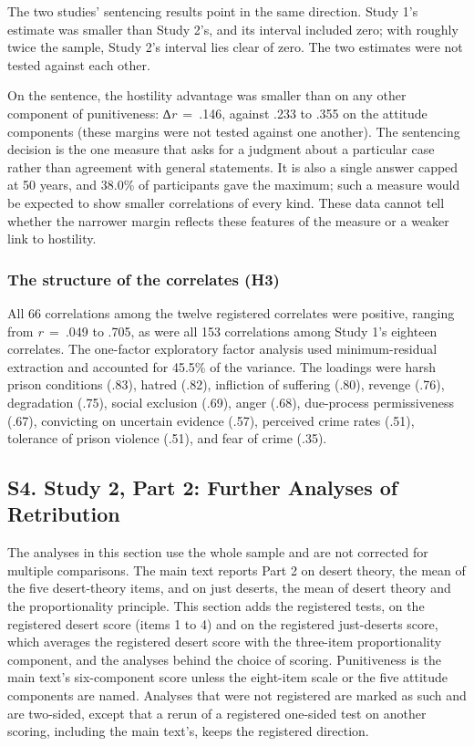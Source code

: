 The two studies' sentencing results point in the same direction. Study 1's estimate was smaller than Study 2's, and its interval included zero; with roughly twice the sample, Study 2's interval lies clear of zero. The two estimates were not tested against each other.

On the sentence, the hostility advantage was smaller than on any other component of punitiveness: ∆\emph{r}~=~.146, against .233 to .355 on the attitude components (these margins were not tested against one another). The sentencing decision is the one measure that asks for a judgment about a particular case rather than agreement with general statements. It is also a single answer capped at 50 years, and 38.0\% of participants gave the maximum; such a measure would be expected to show smaller correlations of every kind. These data cannot tell whether the narrower margin reflects these features of the measure or a weaker link to hostility.

\subsubsection{The structure of the correlates (H3)}\label{the-structure-of-the-correlates-h3}

All 66 correlations among the twelve registered correlates were positive, ranging from \emph{r}~=~.049 to .705, as were all 153 correlations among Study 1's eighteen correlates. The one-factor exploratory factor analysis used minimum-residual extraction and accounted for 45.5\% of the variance. The loadings were harsh prison conditions (.83), hatred (.82), infliction of suffering (.80), revenge (.76), degradation (.75), social exclusion (.69), anger (.68), due-process permissiveness (.67), convicting on uncertain evidence (.57), perceived crime rates (.51), tolerance of prison violence (.51), and fear of crime (.35).

\subsection{S4. Study 2, Part 2: Further Analyses of Retribution}\label{s4.-study-2-part-2-further-analyses-of-retribution}

The analyses in this section use the whole sample and are not corrected for multiple comparisons. The main text reports Part 2 on desert theory, the mean of the five desert-theory items, and on just deserts, the mean of desert theory and the proportionality principle. This section adds the registered tests, on the registered desert score (items 1 to 4) and on the registered just-deserts score, which averages the registered desert score with the three-item proportionality component, and the analyses behind the choice of scoring. Punitiveness is the main text's six-component score unless the eight-item scale or the five attitude components are named. Analyses that were not registered are marked as such and are two-sided, except that a rerun of a registered one-sided test on another scoring, including the main text's, keeps the registered direction.

